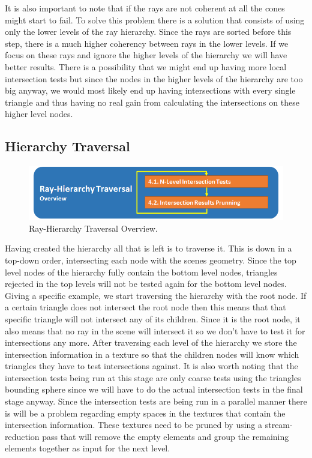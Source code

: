 \documentclass{llncs}
\begin{document}
It is also important to note that if the rays are not coherent at all the cones might start to fail. To solve this problem there is a solution that consists of using only the lower levels of the ray hierarchy. Since the rays are sorted before this step, there is a much higher coherency between rays in the lower levels. If we focus on these rays and ignore the higher levels of the hierarchy we will have better results. There is a possibility that we might end up having more local intersection tests but since the nodes in the higher levels of the hierarchy are too big anyway, we would most likely end up having intersections with every single triangle and thus having no real gain from calculating the intersections on these higher level nodes.

%
\subsection{Hierarchy Traversal}
%

\begin{figure}
\centering
\includegraphics[scale=0.60]{images/figure 5.png}
\caption{Ray-Hierarchy Traversal Overview.}
\end{figure}

Having created the hierarchy all that is left is to traverse it. This is down in a top-down order, intersecting each node with the scenes geometry. Since the top level nodes of the hierarchy fully contain the bottom level nodes, triangles rejected in the top levels will not be tested again for the bottom level nodes. Giving a specific example, we start traversing the hierarchy with the root node. If a certain triangle does not intersect the root node then this means that that specific triangle will not intersect any of its children. Since it is the root node, it also means that no ray in the scene will intersect it so we don't have to test it for intersections any more. After traversing each level of the hierarchy we store the intersection information in a texture so that the children nodes will know which triangles they have to test intersections against. It is also worth noting that the intersection tests being run at this stage are only coarse tests using the triangles bounding sphere since we will have to do the actual intersection tests in the final stage anyway. Since the intersection tests are being run in a parallel manner there is will be a problem regarding empty spaces in the textures that contain the intersection information. These textures need to be pruned by using a stream-reduction pass \cite{RAHStream07} that will remove the empty elements and group the remaining elements together as input for the next level.
\end{document}
